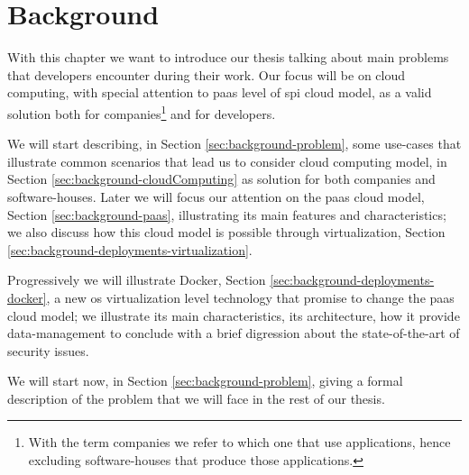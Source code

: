 %
%
\chapter{Background}
\label{cap:background}
With this chapter we want to introduce our thesis talking about main problems that developers
encounter during their work. Our focus will be on cloud computing, with special
attention to \ac{paas} level of \ac{spi} cloud model, as a valid solution both for
companies\footnote{With the term companies we refer to which one that use applications, hence
excluding software-houses that produce those applications.} and for developers.

We will start describing, in Section \ref{sec:background-problem}, some use-cases that illustrate
common scenarios that lead us to consider cloud computing model, in Section 
\ref{sec:background-cloudComputing} as solution for both companies and software-houses.
Later we will focus our attention on the \ac{paas} cloud model, Section \ref{sec:background-paas}, 
illustrating its main features and characteristics; we also discuss how this cloud model is possible
through virtualization, Section \ref{sec:background-deployments-virtualization}.

Progressively we will illustrate Docker, Section \ref{sec:background-deployments-docker}, a new \acs{os}
virtualization level technology that promise to change the \ac{paas} cloud model; we illustrate its
main characteristics, its architecture, how it provide data-management to conclude with a brief digression
about the state-of-the-art of security issues.

We will start now, in Section \ref{sec:background-problem}, giving a formal description of the problem
that we will face in the rest of our thesis.







